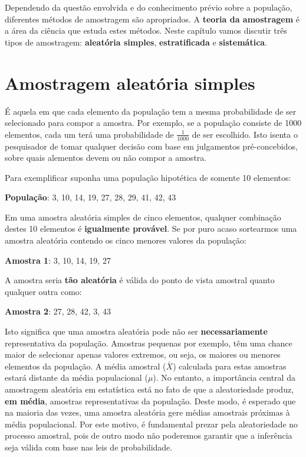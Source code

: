 \documentclass[
]{book}
\begin{document}
Dependendo da questão envolvida e do conhecimento prévio sobre a população, diferentes métodos de amostragem são apropriados. A \textbf{teoria da amostragem} é a área da ciência que estuda estes métodos. Neste capítulo vamos discutir três tipos de amostragem: \textbf{aleatória simples}, \textbf{estratificada} e \textbf{sistemática}.

\hypertarget{amostragem-aleatuxf3ria-simples}{%
\section{Amostragem aleatória simples}\label{amostragem-aleatuxf3ria-simples}}

É aquela em que cada elemento da população tem a mesma probabilidade de ser selecionado para compor a amostra. Por exemplo, se a população consiste de 1000 elementos, cada um terá uma probabilidade de \(\frac{1}{1000}\) de ser escolhido. Isto isenta o pesquisador de tomar qualquer decisão com base em julgamentos pré-concebidos, sobre quais alementos devem ou não compor a amostra.

Para exemplificar suponha uma população hipotética de somente 10 elementos:

\textbf{População}: 3, 10, 14, 19, 27, 28, 29, 41, 42, 43

Em uma amostra aleatória simples de cinco elementos, qualquer combinação destes 10 elementos é \textbf{igualmente provável}. Se por puro acaso sortearmos uma amostra aleatória contendo os cinco menores valores da população:

\textbf{Amostra 1}: 3, 10, 14, 19, 27

A amostra seria \textbf{tão aleatória} é válida do ponto de vista amostral quanto qualquer outra como:

\textbf{Amostra 2}: 27, 28, 42, 3, 43

Isto significa que uma amostra aleatória pode não ser \textbf{necessariamente} representativa da população. Amostras pequenas por exemplo, têm uma chance maior de selecionar apenas valores extremos, ou seja, os maiores ou menores elementos da população. A média amostral (\(\bar{X}\)) calculada para estas amostras estará distante da média populacional (\(\mu\)).
No entanto, a importância central da amostragem aleatória em estatística está no fato de que a aleatoriedade produz, \textbf{em média}, amostras representativas da população. Deste modo, é esperado que na maioria das vezes, uma amostra aleatória gere médias amostrais próximas à média populacional. Por este motivo, é fundamental prezar pela aleatoriedade no processo amostral, pois de outro modo não poderemos garantir que a inferência seja válida com base nas leis de probabilidade.
\end{document}
